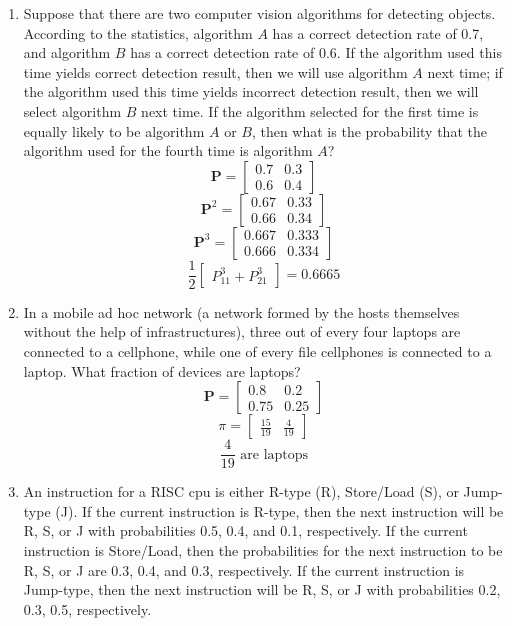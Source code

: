 \documentclass[10.5pt,letterpaper]{article}
\begin{document}
\begin{enumerate}[label=\textbf{Problem \arabic*.}]
\begin{enumerate}[label=\alph*)]
	\end{enumerate}
\item Suppose that there are two computer vision algorithms for detecting objects. According to the statistics, algorithm $A$ has a correct detection rate of 0.7, and algorithm $B$ has a correct detection rate of 0.6. If the algorithm used this time yields correct detection result, then we will use algorithm $A$ next time; if the algorithm used this time yields incorrect detection result, then we will select algorithm $B$ next time. If the algorithm selected for the first time is equally likely to be algorithm $A$ or $B$, then what is the probability that the algorithm used for the fourth time is algorithm $A$?
\[\textbf{P} = \begin{bmatrix}0.7 & 0.3 \\ 0.6 & 0.4\end{bmatrix}\]
\[\textbf{P}^2 = \begin{bmatrix}0.67 & 0.33 \\ 0.66 & 0.34\end{bmatrix}\]
\[\textbf{P}^3 = \begin{bmatrix}0.667 & 0.333 \\ 0.666 & 0.334\end{bmatrix}\]
\[\boxed{\frac{1}{2}\begin{bmatrix}P_{11}^3 + P_{21}^3\end{bmatrix}=0.6665}\]
\item In a mobile ad hoc network (a network formed by the hosts themselves without the help of infrastructures), three out of every four laptops are connected to a cellphone, while one of every file cellphones is connected to a laptop. What fraction of devices are laptops?
\[\textbf{P} = \begin{bmatrix}0.8 & 0.2 \\ 0.75 & 0.25\end{bmatrix}\]
\[\pi = \begin{bmatrix}\frac{15}{19} & \frac{4}{19}\end{bmatrix}\]
\[\boxed{\frac{4}{19} \text{ are laptops}}\]
\item An instruction for a RISC cpu is either R-type (R), Store/Load (S), or Jump-type (J). If the current instruction is R-type, then the next instruction will be R, S, or J with probabilities 0.5, 0.4, and 0.1, respectively. If the current instruction is Store/Load, then the probabilities for the next instruction to be R, S, or J are 0.3, 0.4, and 0.3, respectively. If the current instruction is Jump-type, then the next instruction will be R, S, or J with probabilities 0.2, 0.3, 0.5, respectively.

\end{enumerate}
\end{document}
